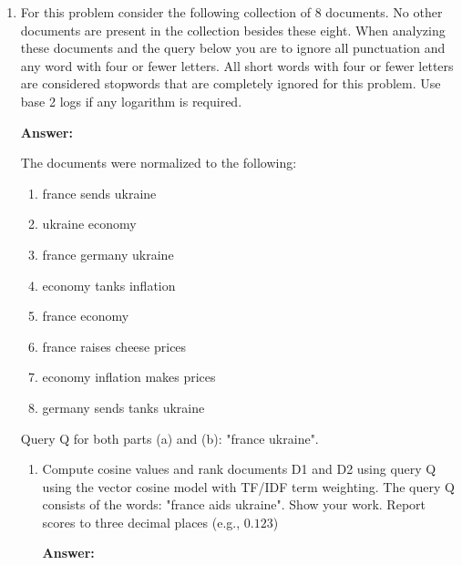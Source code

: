 \documentclass[11pt]{article}
\begin{document}
\begin{enumerate}
\begin{enumerate}
        \end{enumerate}


  \item For this problem consider the following collection of 8 documents. No other documents are present in the collection besides these eight. When analyzing these documents and the query below you are to ignore all punctuation and any word with four or fewer letters. All short words with four or fewer letters are considered stopwords that are completely ignored for this problem. Use base 2 logs if any logarithm is required.

        \textbf{Answer:}

        The documents were normalized to the following:

        \begin{enumerate}[label=D\arabic*:]
          \item france sends ukraine
          \item ukraine economy
          \item france germany ukraine
          \item economy tanks inflation
          \item france economy
          \item france raises cheese prices
          \item economy inflation makes prices
          \item germany sends tanks ukraine
        \end{enumerate}

        Query Q for both parts (a) and (b): "france ukraine".

        \begin{enumerate}
          \item Compute cosine values and rank documents D1 and D2 using query Q using the vector cosine model with TF/IDF term weighting. The query Q consists of the words: "france aids ukraine". Show your work. Report scores to three decimal places (e.g., $0.123$)

                \textbf{Answer:}



\end{enumerate}
\end{enumerate}
\end{document}
